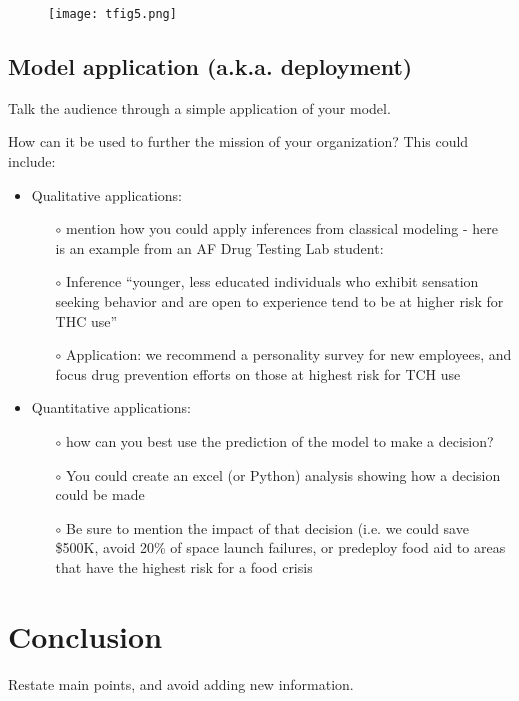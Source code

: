 \documentclass[letterpaper,conference]{IEEEtran}
\begin{document}
{\begin{figure}[!h]
\centering
\texttt{[image: tfig5.png]}
\caption{\color{Red1}{Overfitting corrected by XYZ.}}
\label{fig5}
\end{figure}

\subsection{Model application (a.k.a. deployment)}
Talk the audience through a simple application of your model.  

How can it be used to further the mission of your organization?  This could include:
\begin{itemize}
\item Qualitative applications: 
\begin{itemize}
\item[$\circ$] mention how you could apply inferences from classical modeling - here is an example from an AF Drug Testing Lab student:
\item[$\circ$] Inference “younger, less educated individuals who exhibit sensation seeking behavior and are open to experience tend to be at higher risk for THC use”
\item[$\circ$] Application: we recommend a personality survey for new employees, and focus drug prevention efforts on those at highest risk for TCH use 
\end{itemize}
\item Quantitative applications: 
\begin{itemize}
\item[$\circ$] how can you best use the prediction of the model to make a decision?
\item[$\circ$] You could create an excel (or Python) analysis showing how a decision could be made
\item[$\circ$] Be sure to mention the impact of that decision (i.e. we could save \$500K, avoid 20\% of space launch failures, or predeploy food aid to areas that have the highest risk for a food crisis
\end{itemize}
\end{itemize}

\section{Conclusion}
Restate main points, and avoid adding new information.

}
\color{Purple0}
\end{document}
